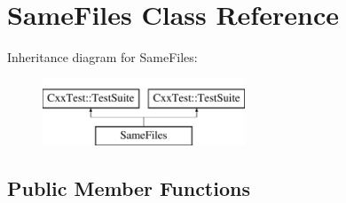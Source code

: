 \hypertarget{classSameFiles}{\section{Same\-Files Class Reference}
\label{classSameFiles}
}
Inheritance diagram for Same\-Files\-:\begin{figure}[H]
\begin{center}
\leavevmode
\includegraphics[height=2.000000cm]{classSameFiles}
\end{center}
\end{figure}
\subsection*{Public Member Functions}
